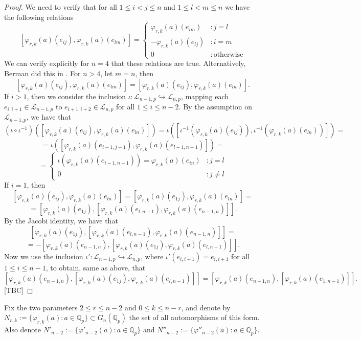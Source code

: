 \documentclass{article}
\begin{document}
\begin{proof}
We need to verify that for all $1\leq{i<j}\leq{n}$ and $1\leq{l<m}\leq{n}$ we have the following relations \[
    [\varphi_{r,k}(a)(e_{ij}),\varphi_{r,k}(a)(e_{lm})]=\begin{cases}
    \varphi_{r,k}(a)(e_{im}) & : j=l\\
        -\varphi_{r,k}(a)(e_{lj}) & : i=m\\
        0 & : \mathrm{otherwise}
    \end{cases}
\]
We can verify explicitly for $n=4$ that these relations are true. Alternatively, Berman did this in \cite[\S{3.3.7}]{BermanThesis}. For $n>4$, let $m=n$, then \[[\varphi_{r,k}(a)(e_{ij}),\varphi_{r,k}(a)(e_{lm})]=[\varphi_{r,k}(a)(e_{ij}),\varphi_{r,k}(a)(e_{ln})].\]
If $i>1$, then we consider the inclusion $\iota:\mathcal{L}_{n-1,p}\hookrightarrow\mathcal{L}_{n,p}$, mapping each $e_{i,i+1}\in\mathcal{L}_{n-1,p}$ to $e_{i+1,i+2}\in\mathcal{L}_{n,p}$ for all $1\leq{i}\leq{n-2}$. By the assumption on $\mathcal{L}_{n-1,p}$, we have that \[
(\iota\circ\iota^{-1})([\varphi_{r,k}(a)(e_{ij}),\varphi_{r,k}(a)(e_{ln})])=\iota([\iota^{-1}(\varphi_{r,k}(a)(e_{ij})),\iota^{-1}(\varphi_{r,k}(a)(e_{ln}))])=\]\[=\iota([\varphi_{r,k}(a)(e_{i-1,j-1}),\varphi_{r,k}(a)(e_{l-1,n-1})])=\]\[=\begin{cases}
\iota(\varphi_{r,k}(a)(e_{i-1,n-1}))=\varphi_{r,k}(a)(e_{in}) & : j=l\\
        0 & : j\neq{l}
    \end{cases}
\]
If $i=1$, then \[[\varphi_{r,k}(a)(e_{ij}),\varphi_{r,k}(a)(e_{ln})]=[\varphi_{r,k}(a)(e_{1j}),\varphi_{r,k}(a)(e_{ln})]=\]\[=[\varphi_{r,k}(a)(e_{1j}),[\varphi_{r,k}(a)(e_{l,n-1}),\varphi_{r,k}(a)(e_{n-1,n})]].\]
By the Jacobi identity, we have that \[[\varphi_{r,k}(a)(e_{1j}),[\varphi_{r,k}(a)(e_{l,n-1}),\varphi_{r,k}(a)(e_{n-1,n})]]=\]\[=-[\varphi_{r,k}(a)(e_{n-1,n}),[\varphi_{r,k}(a)(e_{1j}),\varphi_{r,k}(a)(e_{l,n-1})]].\]
Now we use the inclusion $\iota':\mathcal{L}_{n-1,p}\hookrightarrow\mathcal{L}_{n,p}$, where $\iota'(e_{i,i+1})=e_{i,i+1}$ for all $1\leq{i}\leq{n-1}$, to obtain, same as above, that \[[\varphi_{r,k}(a)(e_{n-1,n}),[\varphi_{r,k}(a)(e_{1j}),\varphi_{r,k}(a)(e_{l,n-1})]]=[\varphi_{r,k}(a)(e_{n-1,n}),[\varphi_{r,k}(a)(e_{1,n-1})]].\]
[TBC]
\end{proof}
Fix the two parameters $2\leq{r}\leq{n-2}$ and $0\leq{k}\leq{n-r}$, and denote by $N_{r,k}:=\{\varphi_{r,k}(a) : a\in\mathbb{Q}_{p}\}\subset{G_{n}(\mathbb{Q}_{p})}$ the set of all automorphisms of this form. Also denote $N'_{n-2}:=\{\varphi'_{n-2}(a) : a\in\mathbb{Q}_{p}\}$ and $N''_{n-2}:=\{\varphi''_{n-2}(a) : a\in\mathbb{Q}_{p}\}.$
\end{document}
